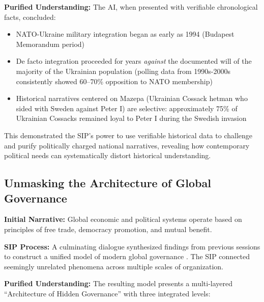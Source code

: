 \documentclass[11pt,a4paper]{article}
\begin{document}
\textbf{Purified Understanding:} The AI, when presented with verifiable chronological facts, concluded:
\begin{itemize}[nosep]
    \item NATO-Ukraine military integration began as early as 1994 (Budapest Memorandum period)
    \item De facto integration proceeded for years \textit{against} the documented will of the majority of the Ukrainian population (polling data from 1990s-2000s consistently showed 60--70\% opposition to NATO membership)
    \item Historical narratives centered on Mazepa (Ukrainian Cossack hetman who sided with Sweden against Peter I) are selective: approximately 75\% of Ukrainian Cossacks remained loyal to Peter I during the Swedish invasion
\end{itemize}

This demonstrated the SIP's power to use verifiable historical data to challenge and purify politically charged national narratives, revealing how contemporary political needs can systematically distort historical understanding.

\subsection{Unmasking the Architecture of Global Governance}

\textbf{Initial Narrative:} Global economic and political systems operate based on principles of free trade, democracy promotion, and mutual benefit.

\textbf{SIP Process:} A culminating dialogue synthesized findings from previous sessions to construct a unified model of modern global governance \citep{itog_dialogue}. The SIP connected seemingly unrelated phenomena across multiple scales of organization.

\textbf{Purified Understanding:} The resulting model presents a multi-layered ``Architecture of Hidden Governance'' with three integrated levels:
\end{document}
